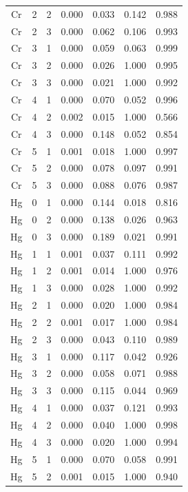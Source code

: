 \documentclass[ms, hidelinks]{uncgdissertationexp}
\theoremstyle{plain}
\theoremstyle{definition}
\theoremstyle{remark}
\begin{document}
\begin{longtable}{ccccccc}
Cr & 2 & 2 & 0.000 & 0.033 & 0.142 & 0.988\\
\rowcolor{gray!6}  Cr & 2 & 3 & 0.000 & 0.062 & 0.106 & 0.993\\
Cr & 3 & 1 & 0.000 & 0.059 & 0.063 & 0.999\\
\rowcolor{gray!6}  Cr & 3 & 2 & 0.000 & 0.026 & 1.000 & 0.995\\
Cr & 3 & 3 & 0.000 & 0.021 & 1.000 & 0.992\\
\rowcolor{gray!6}  Cr & 4 & 1 & 0.000 & 0.070 & 0.052 & 0.996\\
Cr & 4 & 2 & 0.002 & 0.015 & 1.000 & 0.566\\
\rowcolor{gray!6}  Cr & 4 & 3 & 0.000 & 0.148 & 0.052 & 0.854\\
Cr & 5 & 1 & 0.001 & 0.018 & 1.000 & 0.997\\
\rowcolor{gray!6}  Cr & 5 & 2 & 0.000 & 0.078 & 0.097 & 0.991\\
Cr & 5 & 3 & 0.000 & 0.088 & 0.076 & 0.987\\
\rowcolor{gray!6}  Hg & 0 & 1 & 0.000 & 0.144 & 0.018 & 0.816\\
Hg & 0 & 2 & 0.000 & 0.138 & 0.026 & 0.963\\
\rowcolor{gray!6}  Hg & 0 & 3 & 0.000 & 0.189 & 0.021 & 0.991\\
Hg & 1 & 1 & 0.001 & 0.037 & 0.111 & 0.992\\
\rowcolor{gray!6}  Hg & 1 & 2 & 0.001 & 0.014 & 1.000 & 0.976\\
Hg & 1 & 3 & 0.000 & 0.028 & 1.000 & 0.992\\
\rowcolor{gray!6}  Hg & 2 & 1 & 0.000 & 0.020 & 1.000 & 0.984\\
Hg & 2 & 2 & 0.001 & 0.017 & 1.000 & 0.984\\
\rowcolor{gray!6}  Hg & 2 & 3 & 0.000 & 0.043 & 0.110 & 0.989\\
Hg & 3 & 1 & 0.000 & 0.117 & 0.042 & 0.926\\
\rowcolor{gray!6}  Hg & 3 & 2 & 0.000 & 0.058 & 0.071 & 0.988\\
Hg & 3 & 3 & 0.000 & 0.115 & 0.044 & 0.969\\
\rowcolor{gray!6}  Hg & 4 & 1 & 0.000 & 0.037 & 0.121 & 0.993\\
Hg & 4 & 2 & 0.000 & 0.040 & 1.000 & 0.998\\
\rowcolor{gray!6}  Hg & 4 & 3 & 0.000 & 0.020 & 1.000 & 0.994\\
Hg & 5 & 1 & 0.000 & 0.070 & 0.058 & 0.991\\
\rowcolor{gray!6}  Hg & 5 & 2 & 0.001 & 0.015 & 1.000 & 0.940\\

\end{longtable}
\end{document}
